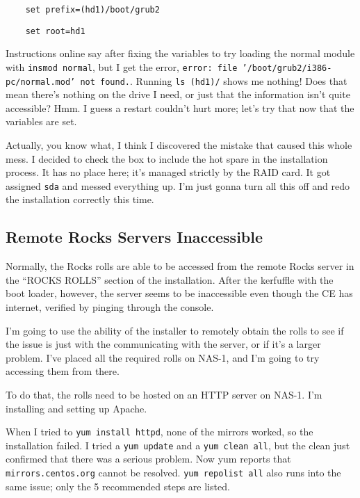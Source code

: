 \documentclass[12pt]{article}
\begin{document}
\begin{tcolorbox}[colback=white, colframe=black]
  \begin{verbatim}
    set prefix=(hd1)/boot/grub2
  \end{verbatim}
  \begin{verbatim}
    set root=hd1
  \end{verbatim}
\end{tcolorbox}

\qq Instructions online say after fixing the variables to try loading the normal
module with {\tt insmod normal}, but I get the error, {\tt error: file
  '/boot/grub2/i386-pc/normal.mod' not found.}. Running {\tt ls (hd1)/} shows me
nothing! Does that mean there's nothing on the drive I need, or just that the
information isn't quite accessible? Hmm. I guess a restart couldn't hurt more;
let's try that now that the variables are set.

\begin{tcolorbox}[title=RESOLUTION, colback=white, colframe=green!40!black]
  Actually, you know what, I think I discovered the mistake that caused this
  whole mess. I decided to check the box to include the hot spare in the
  installation process. It has no place here; it's managed strictly by the RAID
  card. It got assigned {\tt sda} and messed everything up. I'm just gonna turn all
  this off and redo the installation correctly this time.
\end{tcolorbox}

\subsection{Remote Rocks Servers Inaccessible}

\qq Normally, the Rocks rolls are able to be accessed from the remote Rocks
server in the ``ROCKS ROLLS'' section of the installation. After the kerfuffle
with the boot loader, however, the server seems to be inaccessible even though
the CE has internet, verified by pinging through the console.

\qq I'm going to use the ability of the installer to remotely obtain the rolls
to see if the issue is just with the communicating with the server, or if it's a
larger problem. I've placed all the required rolls on NAS-1, and I'm going to
try accessing them from there.

\qq To do that, the rolls need to be hosted on an HTTP server on NAS-1. I'm
installing and setting up Apache.

\qq When I tried to {\tt yum install httpd}, none of the mirrors worked, so the
installation failed. I tried a {\tt yum update} and a {\tt yum clean all}, but the
clean just confirmed that there was a serious problem. Now yum reports that
{\tt mirrors.centos.org} cannot be resolved. {\tt yum repolist all} also runs into
the same issue; only the 5 recommended steps are listed. 
\end{document}
